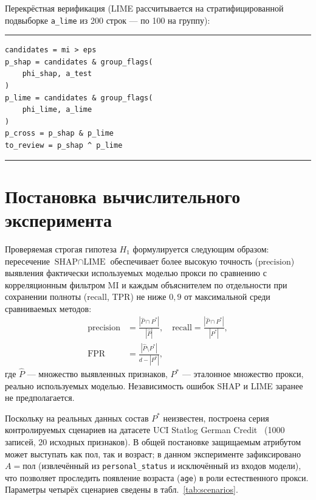 \documentclass{misisarticle}
\begin{document}
Перекрёстная верификация (LIME рассчитывается на стратифицированной подвыборке \texttt{a\_lime} из 200 строк — по 100 на группу):

\par\vspace{3pt}
\noindent\begin{minipage}{\columnwidth}
\noindent\rule{\linewidth}{0.4pt}
\begingroup
\scriptsize
\begin{verbatim}
candidates = mi > eps
p_shap = candidates & group_flags(
    phi_shap, a_test
)
p_lime = candidates & group_flags(
    phi_lime, a_lime
)
p_cross = p_shap & p_lime
to_review = p_shap ^ p_lime
\end{verbatim}
\endgroup
\vspace{-4pt}
\noindent\rule{\linewidth}{0.4pt}
\end{minipage}
\par\vspace{4pt}

\section{Постановка вычислительного эксперимента}

Проверяемая строгая гипотеза $H_1$ формулируется следующим образом: пересечение $\text{SHAP} \cap \text{LIME}$ обеспечивает более высокую точность ($\text{precision}$) выявления фактически используемых моделью прокси по сравнению с корреляционным фильтром MI и каждым объяснителем по отдельности при сохранении полноты ($\text{recall}$, TPR) не ниже $0{,}9$ от максимальной среди сравниваемых методов:
\begin{equation}
\begin{aligned}
\text{precision} &= \frac{|\widehat{P} \cap P^*|}{|\widehat{P}|}, \quad
\text{recall} = \frac{|\widehat{P} \cap P^*|}{|P^*|}, \\
\text{FPR} &= \frac{|\widehat{P} \setminus P^*|}{d - |P^*|},
\end{aligned}
\label{eq:metrics}
\end{equation}
где $\widehat{P}$ — множество выявленных признаков, $P^*$ — эталонное множество прокси, реально используемых моделью. Независимость ошибок SHAP и LIME заранее не предполагается.

Поскольку на реальных данных состав $P^*$ неизвестен, построена серия контролируемых сценариев на датасете UCI Statlog German Credit~\cite{germancredit} (1000 записей, 20 исходных признаков). В общей постановке защищаемым атрибутом может выступать как пол, так и возраст; в данном эксперименте зафиксировано $A = \text{пол}$ (извлечённый из \texttt{personal\_status} и исключённый из входов модели), что позволяет проследить появление возраста (\texttt{age}) в роли естественного прокси. Параметры четырёх сценариев сведены в табл.~\ref{tab:scenarios}.
\end{document}
